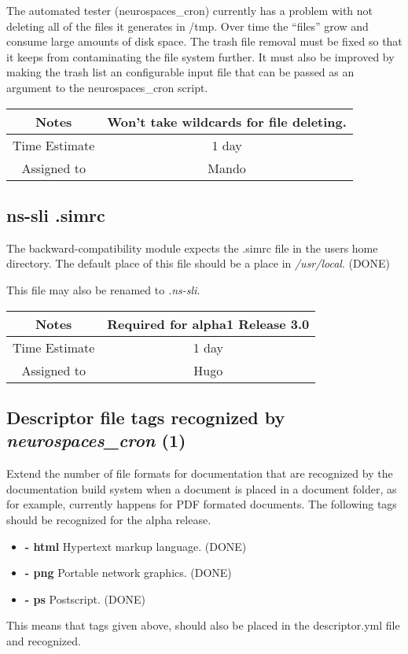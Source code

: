 \documentclass[12pt]{article}
\begin{document}
The automated tester (neurospaces\_cron) currently has a problem with
not deleting all of the files it generates in /tmp. Over time the
``files'' grow and consume large amounts of disk space. The trash file
removal must be fixed so that it keeps from contaminating the file
system further. It must also be improved by making the trash list an
configurable input file that can be passed as an argument to the
neurospaces\_cron script.

{
  \vspace{5mm}
  \centering
  \begin{tabular}{|c|c|}
    \hline
    Notes
    & Won't take wildcards for file deleting. \\
    \hline
    Time Estimate
    & 1 day \\
    \hline
    Assigned to
    & Mando \\
    \hline
  \end{tabular}
}


\subsection{ns-sli .simrc}

The backward-compatibility module expects the .simrc file in the users
home directory.  The default place of this file should be a place in
{\it /usr/local}. (DONE)

This file may also be renamed to {\it .ns-sli}.

{
  \vspace{5mm}
  \centering
  \begin{tabular}{|c|c|}
    \hline
    Notes
    & Required for alpha1 Release 3.0 \\
    \hline
    Time Estimate
    & 1 day \\
    \hline
    Assigned to
    & Hugo \\
    \hline
  \end{tabular}
}


\subsection{Descriptor file tags recognized by {\it neurospaces\_cron} (1)}

Extend the number of file formats for documentation that are
recognized by the documentation build system when a document is placed
in a document folder, as for example, currently happens for PDF
formated documents. The following tags should be recognized for the
alpha release.
\begin{itemize}
   \item[]{\bf - html} Hypertext markup language. (DONE)
    \item[]{\bf - png} Portable network graphics. (DONE)
    \item[]{\bf - ps} Postscript. (DONE)
\end{itemize}
This means that tags given above, should also be placed in the
descriptor.yml file and recognized.
\end{document}
